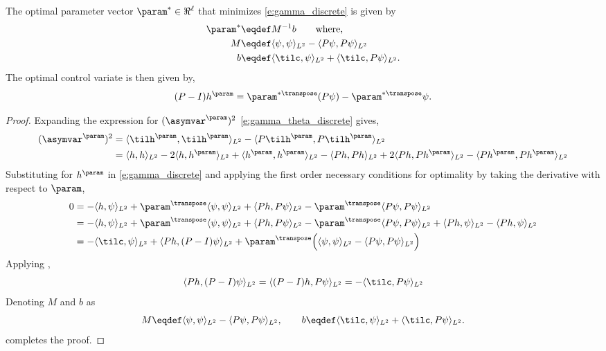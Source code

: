 \begin{proposition}
	\label{t:theta_discrete}
	The optimal parameter vector $\param^* \in \Re^\ell$ that minimizes \eqref{e:gamma_discrete} is given by
	\begin{equation}
	\begin{aligned}
	\param^* & \eqdef M^{-1} b \qquad \text{where,} \\
	M &\eqdef \langle \psi, \psi \rangle_{L^2}- \langle P \psi,  P \psi \rangle_{L^2} \\
	b & \eqdef  \langle \tilc, \psi \rangle_{L^2} +  \langle \tilc, P \psi \rangle_{L^2}.
	\end{aligned}
	\label{e:theta_star_discrete}
	\end{equation}
	The optimal control variate is then given by,
	\[
	(P-I) h^\param = \param^{* \transpose} (P \psi) - \param^{* \transpose} \psi.
	\]
\end{proposition}
\begin{proof}
	Expanding the expression for $(\asymvar^\param)^2$ \eqref{e:gamma_theta_discrete} gives,
	\begin{equation}
	\begin{aligned}
	(\asymvar^\param)^2 & = \langle \tilh^\param, \tilh^\param \rangle_{L^2} - \langle P \tilh^\param, P \tilh^\param \rangle_{L^2} \\
	& = \langle h, h \rangle_{L^2} - 2 \langle h, h^\param \rangle_{L^2} + \langle h^\param , h^\param \rangle_{L^2} - \langle P h, P h \rangle_{L^2} + 2 \langle P h , P h^\param \rangle_{L^2} - \langle P h ^\param , P h^\param \rangle_{L^2}
	\label{e:gamma_discrete}
	\end{aligned}
	\end{equation}
	Substituting for $h^\param$ in \eqref{e:gamma_discrete} and applying the first order necessary conditions for optimality by taking the derivative with respect to $\param$,
	\begin{equation}
	\begin{aligned}
	0 & = - \langle h, \psi \rangle_{L^2} +  \param^\transpose \langle \psi, \psi \rangle_{L^2}+ \langle P h, P \psi \rangle_{L^2}-\param^\transpose  \langle P \psi, P  \psi \rangle_{L^2}  \\
	& = - \langle h, \psi \rangle_{L^2} +  \param^\transpose \langle \psi, \psi \rangle_{L^2}+ \langle P h, P \psi \rangle_{L^2}-\param^\transpose  \langle P \psi, P  \psi \rangle_{L^2}  + \langle P h, \psi \rangle_{L^2} - \langle P h, \psi \rangle_{L^2} \\
	& = - \langle \tilc , \psi \rangle_{L^2} + \langle P h, (P - I) \psi \rangle_{L^2} + \param^\transpose \Bigl( \langle \psi, \psi \rangle_{L^2}  - \langle P \psi, P \psi \rangle_{L^2} \Bigr)
	\label{e:gradient_reversible}
	\end{aligned}
	\end{equation}
	Applying ,
	\[
	\langle P h , (P -I) \psi \rangle_{L^2} = \langle (P - I) h, P \psi\rangle_{L^2} = - \langle \tilc, P \psi \rangle_{L^2}
	\]
	Denoting $M$ and $b$ as
	\[
	M \eqdef \langle \psi, \psi \rangle_{L^2} - \langle P \psi, P \psi \rangle_{L^2}, \qquad b \eqdef \langle \tilc, \psi \rangle_{L^2} + \langle \tilc, P \psi \rangle_{L^2}.
	\]
	completes the proof.
\end{proof}

